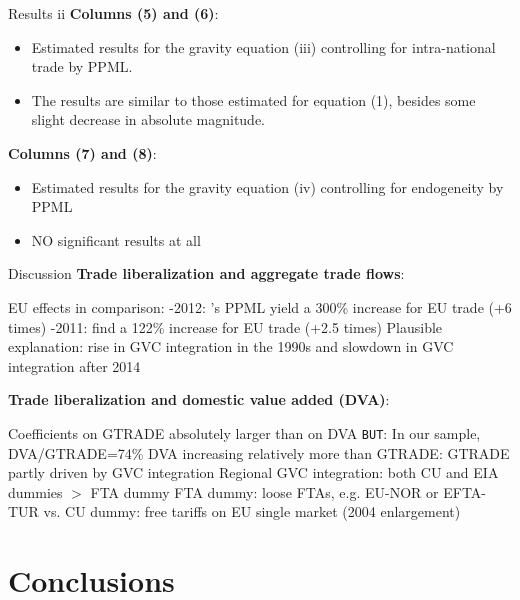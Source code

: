 \documentclass[10pt]{beamer}
\begin{document}
\begin{frame}{Results ii}
\textbf{Columns (5) and (6)}:
\begin{itemize}
    \item Estimated results for the gravity equation (iii) controlling for intra-national trade by PPML. 
    \item The results are similar to those estimated for equation (1), besides some slight decrease in absolute magnitude. 
\end{itemize}

\textbf{Columns (7) and (8)}:
\begin{itemize}
    \item Estimated results for the gravity equation (iv) controlling for endogeneity by PPML
    \item NO significant results at all
\end{itemize}
\end{frame}

\begin{frame}{Discussion}
\textbf{Trade liberalization and aggregate trade flows}:
\begin{outline}
    \1 EU effects in comparison:
    -2012: \cite{mayer2019cost}'s PPML yield a 300\% increase for EU trade (+6 times)
    -2011: \cite{felbermayr2018schengen} find a 122\% increase for EU trade (+2.5 times)
    \3 Plausible explanation: rise in GVC integration in the 1990s and slowdown in GVC integration after 2014
\end{outline}

\textbf{Trade liberalization and domestic value added (DVA)}:
\begin{outline}
    \1 Coefficients on GTRADE absolutely larger than on DVA
    \1 \texttt{BUT}: In our sample, DVA/GTRADE=74\% 
    \2 DVA increasing relatively more than GTRADE: GTRADE partly driven by GVC integration
    \1 Regional GVC integration: both CU and EIA dummies $>$ FTA dummy
    \2 FTA dummy: loose FTAs, e.g. EU-NOR or EFTA-TUR vs. CU dummy: free tariffs on EU single market (2004 enlargement)
\end{outline}


\end{frame}
\section{Conclusions}
\end{document}
